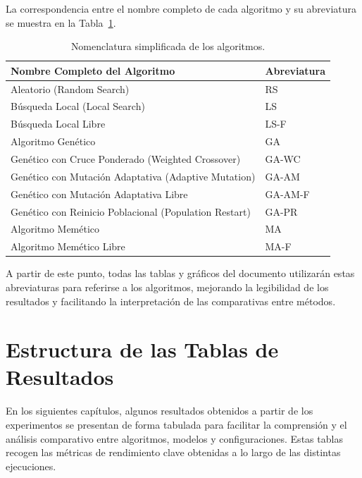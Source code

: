 La correspondencia entre el nombre completo de cada algoritmo y su abreviatura se muestra en la Tabla~\ref{tab:nombres-algoritmos}.

\begin{table}[htp]
    \centering
    \begin{tabular}{ll}
        \toprule
        \textbf{Nombre Completo del Algoritmo}                 & \textbf{Abreviatura} \\
        \midrule
        Aleatorio (Random Search)                              & RS                   \\
        Búsqueda Local (Local Search)                          & LS                   \\
        Búsqueda Local Libre                                   & LS-F                 \\
        Algoritmo Genético                                     & GA                   \\
        Genético con Cruce Ponderado (Weighted Crossover)      & GA-WC                \\
        Genético con Mutación Adaptativa (Adaptive Mutation)   & GA-AM                \\
        Genético con Mutación Adaptativa Libre                 & GA-AM-F              \\
        Genético con Reinicio Poblacional (Population Restart) & GA-PR                \\
        Algoritmo Memético                                     & MA                   \\
        Algoritmo Memético Libre                               & MA-F                 \\
        \bottomrule
    \end{tabular}
    \caption{Nomenclatura simplificada de los algoritmos.}
    \label{tab:nombres-algoritmos}
\end{table}

A partir de este punto, todas las tablas y gráficos del documento utilizarán estas abreviaturas para referirse a los algoritmos,
mejorando la legibilidad de los resultados y facilitando la interpretación de las comparativas entre métodos.


\section{Estructura de las Tablas de Resultados}\label{subsec:estructura-tablas}
En los siguientes capítulos, algunos resultados obtenidos a partir de los experimentos se presentan de forma tabulada para facilitar la
comprensión y el análisis comparativo entre algoritmos, modelos y configuraciones.
Estas tablas recogen las métricas de rendimiento clave obtenidas a lo largo de las distintas ejecuciones.

